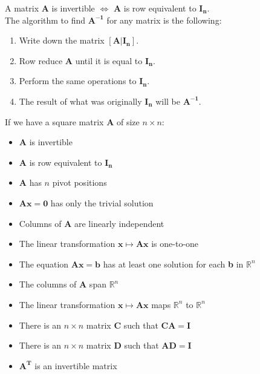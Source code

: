 \documentclass[nobib]{tufte-handout}
\begin{document}
A matrix \textbf{A} is invertible $\iff$ \textbf{A} is row equivalent to $\mathbf{I_n}$.\\
The algorithm to find $\mathbf{A^{-1}}$ for any matrix is the following:
\begin{enumerate}
    \item Write down the matrix $\mathbf{[A|I_n]}$.
    \item Row reduce \textbf{A} until it is equal to $\mathbf{I_n}$.
    \item Perform the same operations to $\mathbf{I_n}$.
    \item The result of what was originally $\mathbf{I_n}$ will be $\mathbf{A^{-1}}$.
\end{enumerate}
If we have a square matrix $\mathbf{A}$ of size $n\times n$:
\begin{itemize}
    \item $\mathbf{A}$ is invertible
    \item $\mathbf{A}$ is row equivalent to $\mathbf{I_n}$
    \item $\mathbf{A}$ has $n$ pivot positions
    \item $\mathbf{Ax = 0}$ has only the trivial solution
    \item Columns of \textbf{A} are linearly independent
    \item The linear transformation $\mathbf{x\mapsto Ax}$ is one-to-one
    \item The equation $\mathbf{Ax=b}$ has at least one solution for each \textbf{b} in
          $\mathbb{R}^n$
    \item The columns of \textbf{A} span $\mathbb{R}^n$
    \item The linear transformation $\mathbf{x\mapsto Ax}$ maps $\mathbb{R}^n$ to
          $\mathbb{R}^n$
    \item There is an $n \times n$ matrix \textbf{C} such that $\mathbf{CA = I}$
    \item There is an $n \times n$ matrix \textbf{D} such that $\mathbf{AD = I}$
    \item $\mathbf{A^T}$ is an invertible matrix
\end{itemize}
\end{document}
